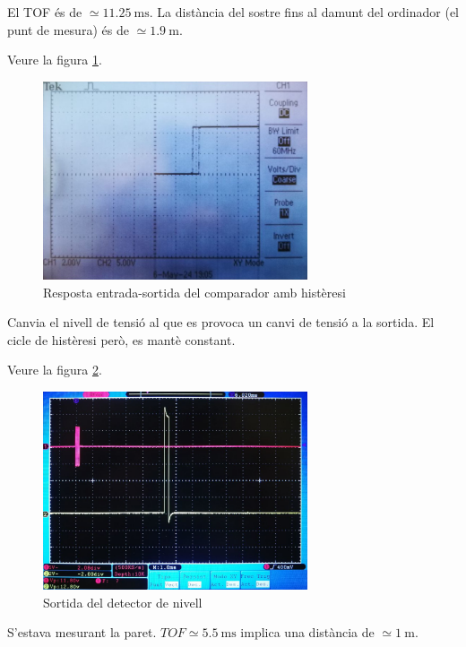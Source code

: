 \documentclass[catalan, a4paper, nobib]{tufte-handout}
\begin{document}
 El TOF és de $\simeq\qty{11.25}{\milli\second}$. La distància del sostre fins al damunt del ordinador (el punt de mesura) és de $\simeq\qty{1.9}{\meter}$.

 Veure la figura \ref{fig:1_6}.

\begin{figure}
  \begin{center}
    \includegraphics[width=295px]{1_6.png}
  \end{center}
  \caption{Resposta entrada-sortida del comparador amb histèresi}
  \label{fig:1_6}
\end{figure}

 Canvia el nivell de tensió al que es provoca un canvi de tensió a la sortida. El cicle de histèresi però, es mantè constant.

 Veure la figura \ref{fig:1_9}.

\begin{figure}
  \begin{center}
    \includegraphics[width=295px]{1_9.png}
  \end{center}
  \caption{Sortida del detector de nivell}
  \label{fig:1_9}
\end{figure}

 S'estava mesurant la paret. $TOF\simeq\qty{5.5}{\milli\second}$ implica una distància de $\simeq\qty{1}{\meter}$.
\end{document}
